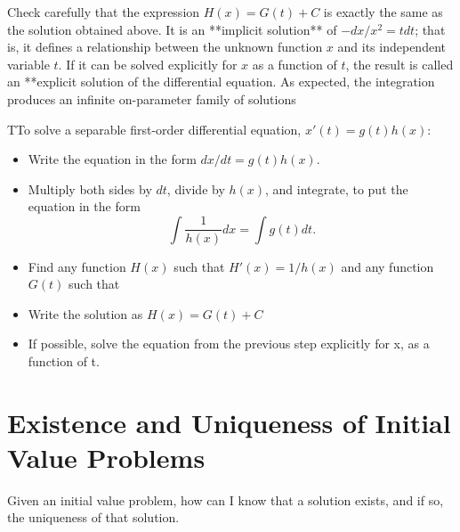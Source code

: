  Check carefully that the expression $H(x)=G(t)+C$ is exactly the same as the solution obtained above. It is an **implicit solution** of $-dx/x^2=tdt$; that is, it defines a relationship between the unknown function $x$ and its independent variable $t$. If it can be solved explicitly for $x$ as a function of $t$, the result is called an **explicit solution of the differential equation. As expected, the integration produces an infinite on-parameter family of solutions

  \begin{theorem}
    TTo solve a separable first-order differential equation, $x'(t)=g(t)h(x)$:
    \begin{itemize}
      \item Write the equation in the form $dx/dt=g(t)h(x)$.
      \item Multiply both sides by $dt$, divide by $h(x)$, and integrate, to put the equation in the form 
        \begin{equation}
          \int \frac{1}{h(x)}dx =\int g(t)dt.
        \end{equation}
      \item Find any function $H(x)$ such that $H'(x)=1/h(x)$ and any function $G(t)$ such that %
      \item Write the solution as $H(x)=G(t)+C$
      \item If possible, solve the equation from the previous step explicitly for x, as a function of t.
    \end{itemize}
  \end{theorem}

\section{}\section{}

\section{Existence and Uniqueness of Initial Value Problems}

  Given an initial value problem, how can I know that a solution exists, and if so, the uniqueness of that solution.

